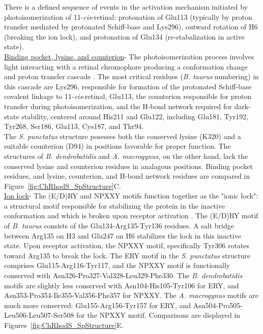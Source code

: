 \indent There is a defined sequence of events in the activation mechanism initiated by photoisomerization of 11-\textit{cis}-retinal: protonation of Glu113 (typically by proton transfer mediated by protonated Schiff-base and Lys296), outward rotation of H6 (breaking the ion lock), and protonation of Glu134 (re-stabalization in active state).\\
\indent \underline{Binding pocket, lysine, and counterion}- The photoisomerization process involves light interacting with a retinal chromophore producing a conformation change and proton transfer cascade \cite{Birge1990,Smith2010}. The most critical residues (\textit{B. taurus} numbering) in this cascade are Lys296, responsible for formation of the protonated Schiff-base covalent linkage to 11-\textit{cis}-retinal, Glu113, the counterion responsible for proton transfer during photoisomerization, and the H-bond network required for dark-state stability, centered around His211 and Glu122, including Glu181, Tyr192, Tyr268, Ser186, Glu113, Cys187, and Thr94. \\
\indent The \textit{S. punctatus} structure posesses both the conserved lysine (K320) and a suitable counterion (D94) in positions favorable for proper function. The structures of \textit{B. dendrobatidis} and \textit{A. macrogynus}, on the other hand, lack the conserved lysine and counterion residues in analagous positions. Binding pocket residues, and lysine, counterion, and H-bond network residues are compared in Figure~\ref{fig:ChRhodS_SpStructure}C.\\
\indent \underline{Ion lock}- The (E/D)RY and NPXXY motifs function together as the "ionic lock": a structural motif responsible for stabilizing the protein in the inactive conformation and which is broken upon receptor activation \cite{Smith2010}. The (E/D)RY motif of \textit{B. taurus} consists of the Glu134-Arg135-Tyr136 residues. A salt bridge between Arg135 on H3 and Glu247 on H6 stabilizes the lock in this inactive state. Upon receptor activation, the NPXXY motif, specifically Tyr306 rotates toward Arg135 to break the lock. The ERY motif in the \textit{S. punctatus} structure comprises Glu115-Arg116-Tyr117, and the NPXXY motif is functionally conserved with Asn326-Pro327-Val328-Leu329-Phe330. The \textit{B. dendrobatidis} motifs are slightly less conserved with Asn104-His105-Tyr106 for ERY, and Asn353-Pro354-Ile355-Val356-Phe357 for NPXXY. The \textit{A. macrogynus} motifs are much more conserved: Glu155-Arg156-Tyr157 for ERY, and Asn504-Pro505-Leu506-Leu507-Ser508 for the NPXXY motif. Comparisons are displayed in Figures~\ref{fig:ChRhodS_SpStructure}E. \\
